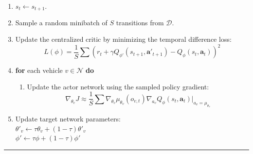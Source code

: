 \documentclass[12pt,a4paper]{report}
\begin{document}
\begin{enumerate}
\begin{enumerate}
\begin{enumerate}
            \item $s_t \leftarrow s_{t+1}$.
            \item Sample a random minibatch of $S$ transitions from $\mathcal{D}$.
            \item Update the centralized critic by minimizing the temporal difference loss:
            \[ L(\phi) = \frac{1}{S} \sum \left( r_t + \gamma Q_{\phi'}(s_{t+1}, \boldsymbol{a}'_{t+1}) - Q_{\phi}(s_t, \boldsymbol{a}_t) \right)^2 \]
            \item \textbf{for} each vehicle $v \in \mathcal{N}$ \textbf{do}
            \begin{enumerate}
                \item Update the actor network using the sampled policy gradient:
                \[ \nabla_{\theta_v} J \approx \frac{1}{S} \sum \nabla_{\theta_v} \mu_{\theta_v}(o_{v,t}) \nabla_{a_v} Q_{\phi}(s_t, \boldsymbol{a}_t)|_{a_v=\mu_{\theta_v}} \]
            \end{enumerate}
            \item Update target network parameters: \\
            $\theta'_v \leftarrow \tau \theta_v + (1 - \tau) \theta'_v$ \\
            $\phi' \leftarrow \tau \phi + (1 - \tau) \phi'$
        \end{enumerate}
    \end{enumerate}
\end{enumerate}
\noindent\rule{\textwidth}{1pt}
\vspace{0.5cm}
\end{document}
